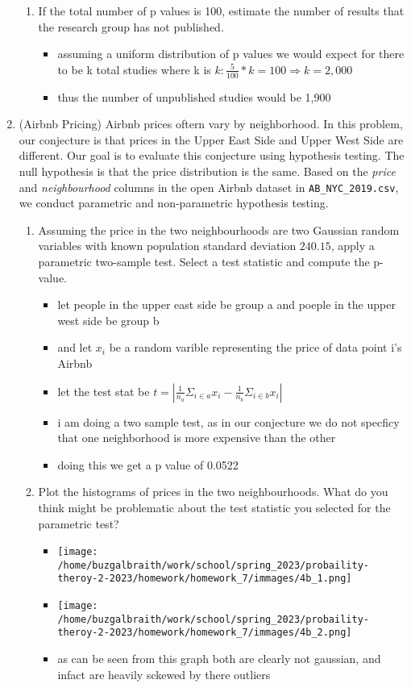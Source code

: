\documentclass[12pt,twoside]{article}
\begin{document}
\begin{enumerate}
\begin{enumerate}
\item If the total number of p values is 100, estimate the number of results that the research group has not published. 
\begin{itemize}
  \color{blue}
  \item assuming a uniform distribution of p values we would expect for there to be k total studies where k is  $k:\frac{5}{100}*k=100\Rightarrow k=2,000$
  \item thus the number of unpublished studies would be 1,900
\end{itemize}

\end{enumerate}
\newpage
\item (Airbnb Pricing)
Airbnb prices oftern vary by neighborhood. In this problem, our conjecture is that prices in the Upper East Side and Upper West Side are different. Our goal is to evaluate this conjecture using hypothesis testing. The null hypothesis is that the price distribution is the same. Based on the \textit{price} and \textit{neighbourhood} columns in the open Airbnb dataset in \texttt{AB\_NYC\_2019.csv}, we conduct parametric and non-parametric hypothesis testing. 
\begin{enumerate} 

\item Assuming the price in the two neighbourhoods are two Gaussian random variables with known population standard deviation $240.15$, apply a parametric two-sample test. Select a test statistic and compute the p-value.
\begin{itemize}
  \color{blue}
  \item let people in the upper east side be group a and poeple in the upper west side be group b 
  \item and let $x_i$ be a random varible representing the price of data point i's Airbnb
  \item let the test stat be $t=|\frac{1}{n_{a}}\Sigma_{i\in a}x_i-\frac{1}{n_{b}}\Sigma_{i\in b}x_i|$
  \item i am doing a two sample test, as in our conjecture we do not specficy that one neighborhood is more expensive than the other
  \item doing this we get a p value of 0.0522
\end{itemize}

\item Plot the histograms of prices in the two neighbourhoods. What do you think might be problematic about the test statistic you selected for the parametric test? 
\begin{itemize}
  \color{blue}
  \item \texttt{[image: /home/buzgalbraith/work/school/spring\_2023/probaility-theroy-2-2023/homework/homework\_7/immages/4b\_1.png]} 
   \item \texttt{[image: /home/buzgalbraith/work/school/spring\_2023/probaility-theroy-2-2023/homework/homework\_7/immages/4b\_2.png]}  
  \item as can be seen from this graph both are clearly not gaussian, and infact are heavily sckewed by there outliers
\end{itemize}


\end{enumerate}
\end{enumerate}
\end{document}
